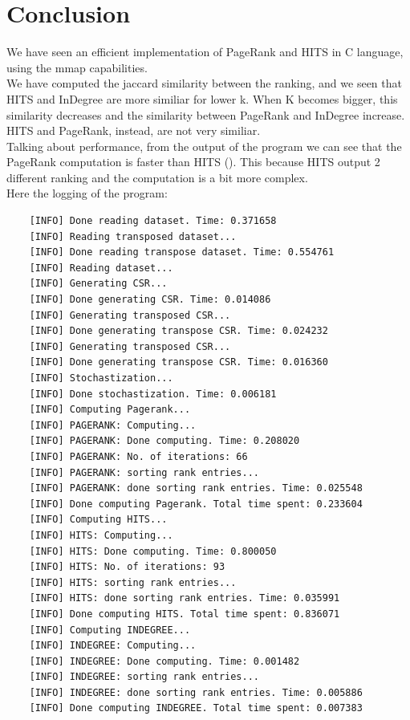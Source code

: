 \documentclass[10pt]{article}
\begin{document}
\section{Conclusion}
We have seen an efficient implementation of PageRank and HITS in C language, using the mmap capabilities.\\
We have computed the jaccard similarity between the ranking, and we seen that HITS and InDegree are more similiar for lower k. When K becomes bigger, this similarity decreases and the similarity between PageRank and InDegree increase.\\
HITS and PageRank, instead, are not very similiar.\\
Talking about performance, from the output of the program we can see that the PageRank computation is faster than HITS (). This because HITS output 2 different ranking and the computation is a bit more complex.\\
Here the logging of the program:\\
\begin{verbatim}
    [INFO] Done reading dataset. Time: 0.371658
    [INFO] Reading transposed dataset...
    [INFO] Done reading transpose dataset. Time: 0.554761
    [INFO] Reading dataset...
    [INFO] Generating CSR...
    [INFO] Done generating CSR. Time: 0.014086
    [INFO] Generating transposed CSR...
    [INFO] Done generating transpose CSR. Time: 0.024232
    [INFO] Generating transposed CSR...
    [INFO] Done generating transpose CSR. Time: 0.016360
    [INFO] Stochastization...
    [INFO] Done stochastization. Time: 0.006181
    [INFO] Computing Pagerank...
    [INFO] PAGERANK: Computing... 
    [INFO] PAGERANK: Done computing. Time: 0.208020
    [INFO] PAGERANK: No. of iterations: 66
    [INFO] PAGERANK: sorting rank entries...
    [INFO] PAGERANK: done sorting rank entries. Time: 0.025548
    [INFO] Done computing Pagerank. Total time spent: 0.233604
    [INFO] Computing HITS...
    [INFO] HITS: Computing... 
    [INFO] HITS: Done computing. Time: 0.800050
    [INFO] HITS: No. of iterations: 93
    [INFO] HITS: sorting rank entries...
    [INFO] HITS: done sorting rank entries. Time: 0.035991
    [INFO] Done computing HITS. Total time spent: 0.836071
    [INFO] Computing INDEGREE...
    [INFO] INDEGREE: Computing...
    [INFO] INDEGREE: Done computing. Time: 0.001482
    [INFO] INDEGREE: sorting rank entries...
    [INFO] INDEGREE: done sorting rank entries. Time: 0.005886
    [INFO] Done computing INDEGREE. Total time spent: 0.007383
\end{verbatim}
\end{document}

